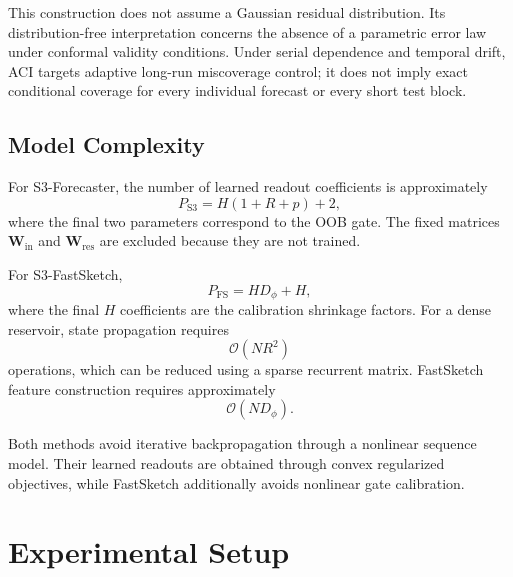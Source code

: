 \documentclass[review,number,sort&compress]{elsarticle}
\begin{document}
This construction does not assume a Gaussian residual distribution. Its
distribution-free interpretation concerns the absence of a parametric error
law under conformal validity conditions. Under serial dependence and temporal
drift, ACI targets adaptive long-run miscoverage control; it does not imply
exact conditional coverage for every individual forecast or every short test
block.

\subsection{Model Complexity}
\label{subsec:model_complexity}

For S3-Forecaster, the number of learned readout coefficients is approximately
\begin{equation}
    P_{\mathrm{S3}}
    =
    H(1+R+p)
    +
    2,
\end{equation}
where the final two parameters correspond to the OOB gate. The fixed matrices
$\bm{W}_{\mathrm{in}}$ and $\bm{W}_{\mathrm{res}}$ are excluded because they are
not trained.

For S3-FastSketch,
\begin{equation}
    P_{\mathrm{FS}}
    =
    H D_\phi+H,
\end{equation}
where the final $H$ coefficients are the calibration shrinkage factors.
For a dense reservoir, state propagation requires
\begin{equation}
    \mathcal{O}(NR^2)
\end{equation}
operations, which can be reduced using a sparse recurrent matrix. FastSketch
feature construction requires approximately
\begin{equation}
    \mathcal{O}(ND_\phi).
\end{equation}

Both methods avoid iterative backpropagation through a nonlinear sequence
model. Their learned readouts are obtained through convex regularized
objectives, while FastSketch additionally avoids nonlinear gate calibration.


\section{Experimental Setup}
\label{sec:experimental_setup}
\end{document}

